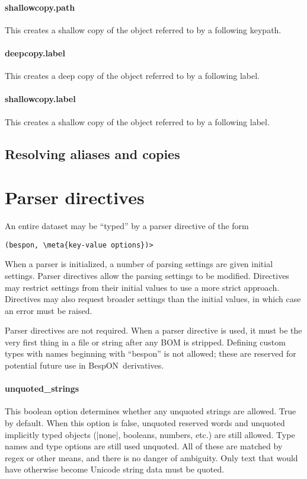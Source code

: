 \documentclass[11pt]{article}
\newcommand{\bespon}{BespON}
\newcommand{\meta}[1]{\ensuremath{\langle}\textit{#1}\ensuremath{\rangle}}
\begin{document}
{{\paragraph{shallowcopy.path}
This creates a shallow copy of the object referred to by a following keypath.

\paragraph{deepcopy.label}
This creates a deep copy of the object referred to by a following label.

\paragraph{shallowcopy.label}
This creates a shallow copy of the object referred to by a following label.



\subsection{Resolving aliases and copies}






\section{Parser directives}
\label{sec:parser-directive}

An entire dataset may be ``typed'' by a parser directive of the form
\begin{Verbatim}[commandchars=\\\{\}]
(bespon, \meta{key-value options})>
\end{Verbatim}
When a parser is initialized, a number of parsing settings are given initial settings.  Parser directives allow the parsing settings to be modified.  Directives may restrict settings from their initial values to use a more strict approach.  Directives may also request broader settings than the initial values, in which case an error must be raised.

Parser directives are not required.  When a parser directive is used, it must be the very first thing in a file or string after any BOM is stripped.  Defining custom types with names beginning with ``bespon'' is not allowed; these are reserved for potential future use in \bespon\ derivatives.

\paragraph{unquoted\_strings}
This boolean option determines whether any unquoted strings are allowed.  True by default.  When this option is false, unquoted reserved words and unquoted implicitly typed objects (|none|, booleans, numbers, etc.) are still allowed.  Type names and type options are still used unquoted.  All of these are matched by regex or other means, and there is no danger of ambiguity.  Only text that would have otherwise become Unicode string data must be quoted.

}}
\end{document}
